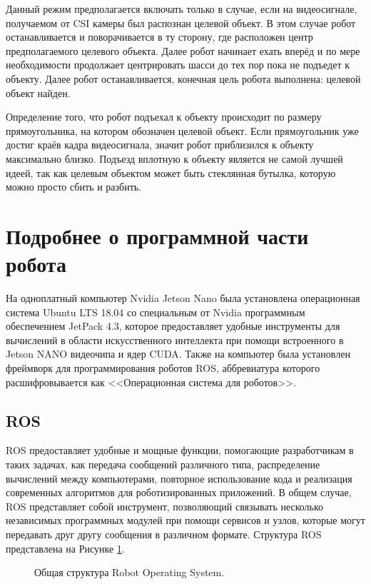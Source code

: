 Данный режим предполагается включать только в случае, если на видеосигнале, получаемом от CSI камеры был распознан целевой объект. В этом случае робот останавливается и поворачивается в ту сторону, где расположен центр предполагаемого целевого объекта. Далее робот начинает ехать вперёд и по мере необходимости продолжает центрировать шасси до тех пор пока не подъедет к объекту. Далее робот останавливается, конечная цель робота выполнена: целевой объект найден. 

Определение того, что робот подъехал к объекту происходит по размеру прямоугольника, на котором обозначен целевой объект. Если прямоугольник уже достиг краёв кадра видеосигнала, значит робот приблизился к объекту максимально близко. Подъезд вплотную к объекту является не самой лучшей идеей, так как целевым объектом может быть стеклянная бутылка, которую можно просто сбить и разбить.

\section{Подробнее о программной части робота}
На одноплатный компьютер Nvidia Jetson Nano была установлена операционная система Ubuntu LTS 18.04 со специальным от Nvidia программным обеспечением JetPack 4.3, которое предоставляет удобные инструменты для вычислений в области искусственного интеллекта при помощи встроенного в Jetson NANO видеочипа и ядер CUDA. Также на компьютер была установлен фреймворк для программирования роботов ROS, аббревиатура которого расшифровывается как <<Операционная система для роботов>>.

\subsection{ROS}
ROS предоставляет удобные и мощные функции, помогающие разработчикам в таких задачах, как передача сообщений различного типа, распределение вычислений между компьютерами, повторное использование кода и реализация современных алгоритмов для роботизированных приложений. В общем случае, ROS представляет собой инструмент, позволяющий связывать несколько независимых программных модулей при помощи сервисов и узлов, которые могут передавать друг другу сообщения в различном формате. Структура ROS представлена на Рисунке \ref{fig:ros-compute-graph}.

\begin{figure}[ht]
  \caption{Общая структура Robot Operating System.}\label{fig:ros-compute-graph}
\end{figure}


